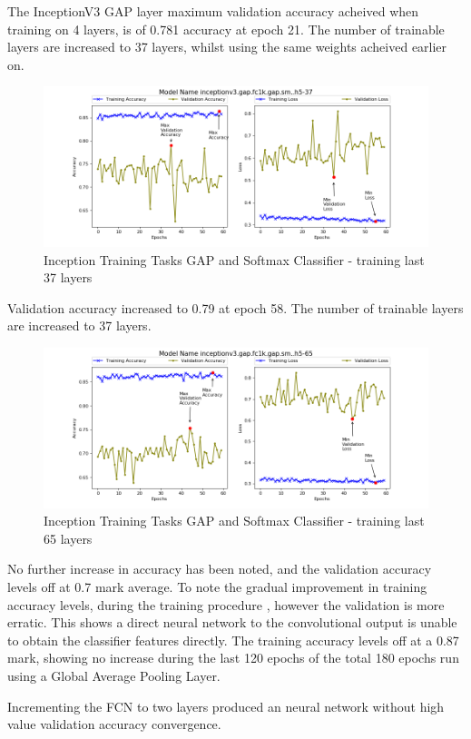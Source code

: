 \documentclass{article}
\begin{document}
\begin{enumerate}
The InceptionV3 GAP layer maximum validation accuracy acheived when training on 4 layers, is of 0.781 accuracy at epoch 21. The number of trainable layers are increased to 37 layers, whilst using the same weights acheived earlier on. 

\begin{figure}[H]
\centering
\label{fig:incv3-gap-37}
\includegraphics[scale=0.6]{images/t1-i3-gap-sm-37.png}
\caption{Inception Training Tasks GAP and Softmax Classifier - training last 37 layers}
\end{figure}

Validation accuracy increased to 0.79 at epoch 58. The number of trainable layers are increased to 37 layers.

\begin{figure}[H]
\centering
\label{fig:incv3-gap-4}
\includegraphics[scale=0.6]{images/t1-i3-gap-sm-65.png}
\caption{Inception Training Tasks GAP and Softmax Classifier - training last 65 layers}
\end{figure}

No further increase in accuracy has been noted, and the validation accuracy levels off at 0.7 mark average. To note the gradual improvement in training accuracy levels, during the training procedure , however the validation is more erratic. This shows a direct neural network to the convolutional output is unable to obtain the classifier features directly. The training accuracy levels off at a 0.87 mark, showing no increase during the last 120 epochs of the total 180 epochs run using a Global Average Pooling Layer. \newline

Incrementing the FCN to two layers produced an neural network without high value validation accuracy convergence.

\end{enumerate}
\end{document}
